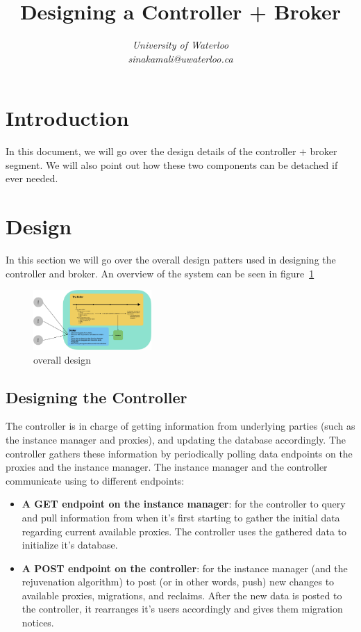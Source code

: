 \documentclass[conference]{IEEEtran}
\begin{document}
\title{Designing a Controller + Broker}

\author{
\textit{University of Waterloo}\\
\textit{sinakamali@uwaterloo.ca}
}

\maketitle

\section{Introduction}
In this document, we will go over the design details of the controller + broker segment. We will also point out how these two components can be detached if ever needed.

\section{Design}
In this section we will go over the overall design patters used in designing the controller and broker. An overview of the system can be seen in figure~\ref*{fig:odesign}

\begin{figure}[h]
    \centering
    \includegraphics[width=0.4\textwidth]{design.jpeg}
    \caption{overall design}
    \label{fig:odesign}
\end{figure}

\subsection{Designing the Controller}
The controller is in charge of getting information from underlying parties (such as the instance manager and proxies), and updating the database accordingly. The controller gathers these information by periodically polling data endpoints on the proxies and the instance manager. The instance manager and the controller communicate using to different endpoints:

\begin{itemize}
    \item \textbf{A GET endpoint on the instance manager}: for the controller to query and pull information from when it's first starting to gather the initial data regarding current available proxies. The controller uses the gathered data to initialize it's database.
    \item \textbf{A POST endpoint on the controller}: for the instance manager (and the rejuvenation algorithm) to post (or in other words, push) new changes to available proxies, migrations, and reclaims. After the new data is posted to the controller, it rearranges it's users accordingly and gives them migration notices.
\end{itemize}
\end{document}
